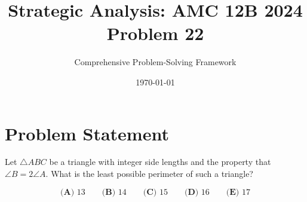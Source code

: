 \documentclass[12pt]{article}
\begin{document}
\title{\textbf{Strategic Analysis: AMC 12B 2024 Problem 22}}
\author{Comprehensive Problem-Solving Framework}
\date{\today}
\maketitle

\section*{Problem Statement}

Let $\triangle ABC$ be a triangle with integer side lengths and the property that $\angle B = 2\angle A$. What is the least possible perimeter of such a triangle?

$$\textbf{(A) } 13 \qquad \textbf{(B) } 14 \qquad \textbf{(C) } 15 \qquad \textbf{(D) } 16 \qquad \textbf{(E) } 17$$

\vspace{1cm}
\end{document}
